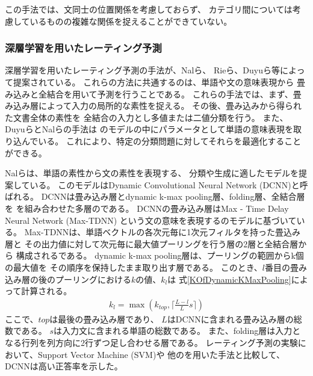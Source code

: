 この手法では、文同士の位置関係を考慮しておらず、
カテゴリ間については考慮しているものの複雑な関係を捉えることができていない。

\subsubsection{深層学習を用いたレーティング予測}

深層学習を用いたレーティング予測の手法が、Nalら\cite{nal14}、
Rieら\cite{rie14}、Duyuら\cite{duyu15}等によって提案されている。
これらの方法に共通するのは、単語や文の意味表現から
畳み込み\nn と全結合\nn を用いて予測を行うことである。
これらの手法では、まず、畳み込み層によって入力の局所的な素性を捉える。
その後、畳み込み\nn から得られた文書全体の素性を
全結合\nn の入力とし多値または二値分類を行う。
また、Duyuら\cite{duyu15}とNalら\cite{nal14}の手法は
\nn のモデルの中にパラメータとして単語の意味表現を取り込んでいる。
これにより、特定の分類問題に対してそれらを最適化することができる。

Nalら\cite{nal14}は、単語の素性から文の素性を表現する、
分類や生成に適したモデルを提案している。
このモデルはDynamic Convolutional Neural Network (DCNN)と呼ばれる。
DCNNは畳み込み層とdynamic k-max pooling層、folding層、全結合層を
を組み合わせた多層の\nn である。
DCNNの畳み込み層はMax - Time Delay Neural Network (Max-TDNN)\cite{ronan08}
という文の意味を表現する\nn のモデルに基づいている。
Max-TDNNは、単語ベクトルの各次元毎に1次元フィルタを持った畳込み層と
その出力値に対して次元毎に最大値プーリングを行う層の2層と全結合層から
構成される\nn である。
dynamic k-max pooling層は、プーリングの範囲からk個の最大値を
その順序を保持したまま取り出す層である。
このとき、$l$番目の畳み込み層の後のプーリングにおける$k$の値、$k_l$は
式\ref{KOfDynamicKMaxPooling}によって計算される。
\begin{gather} \label{KOfDynamicKMaxPooling}
  k_l = \max ( k_{top}, \lceil \frac{L - l}{L}s \rceil )
\end{gather}
ここで、$top$は最後の畳み込み層であり、
$L$はDCNNに含まれる畳み込み層の総数である。
$s$は入力文に含まれる単語の総数である。
また、folding層は入力となる行列を列方向に2行ずつ足し合わせる層である。
レーティング予測の実験において、Support Vector Machine (SVM)や
他の\nn を用いた手法と比較して、DCNNは高い正答率を示した。

